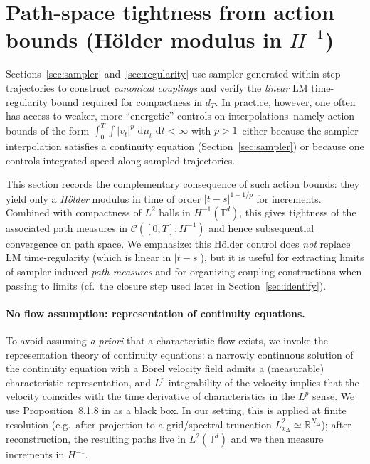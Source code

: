 \documentclass{article}
\numberwithin{equation}{section}
\theoremstyle{plain}
\theoremstyle{definition}
\theoremstyle{remark}
\newcommand{\R}{\mathbb{R}}
\newcommand{\T}{\mathbb{T}}
\newcommand{\Ccal}{\mathcal{C}}
\newcommand{\dd}{\,\mathrm{d}}
\begin{document}
\section{Path-space tightness from action bounds (H\"older modulus in $H^{-1}$)}
\label{sec:superposition}

 
Sections~\ref{sec:sampler} and~\ref{sec:regularity} use sampler-generated within-step trajectories to construct
\emph{canonical couplings} and verify the \emph{linear} LM time-regularity bound required for compactness in $d_T$.
In practice, however, one often has access to weaker, more ``energetic'' controls on interpolations--namely action bounds
of the form $\int_0^T\!\int |v_t|^p\,\dd\mu_t\,\dd t<\infty$ with $p>1$--either because the sampler interpolation satisfies
a continuity equation (Section~\ref{sec:sampler}) or because one controls integrated speed along sampled trajectories.

This section records the complementary consequence of such action bounds: they yield only a \emph{H\"older} modulus in time
of order $|t-s|^{1-1/p}$ for increments. Combined with compactness of $L^2$ balls in $H^{-1}(\T^d)$, this gives
tightness of the associated path measures in $\Ccal([0,T];H^{-1})$ and hence subsequential convergence on path space.
We emphasize: this H\"older control does \emph{not} replace LM time-regularity (which is linear in $|t-s|$), but it is
useful for extracting limits of sampler-induced \emph{path measures} and for organizing coupling constructions when passing
to limits (cf.\ the closure step used later in Section~\ref{sec:identify}).

\paragraph{No flow assumption: representation of continuity equations.}
To avoid assuming \emph{a priori} that a characteristic flow exists, we invoke the representation theory of continuity
equations: a narrowly continuous solution of the continuity equation with a Borel velocity field admits a (measurable)
characteristic representation, and $L^p$-integrability of the velocity implies that the velocity coincides with the time
derivative of characteristics in the $L^p$ sense. We use Proposition~8.1.8 in \cite{ambrosio2004gradient} as a black box.
In our setting, this is applied at finite resolution (e.g.\ after projection to a grid/spectral truncation
$L^2_{x_\Delta}\simeq\R^{N_\Delta}$); after reconstruction, the resulting paths live in $L^2(\T^d)$ and we then measure
increments in $H^{-1}$.
\end{document}
